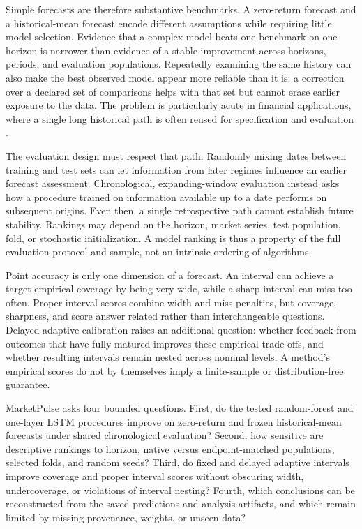\documentclass[11pt]{article}
\begin{document}
Simple forecasts are therefore substantive benchmarks. A zero-return forecast and a historical-mean forecast encode different assumptions while requiring little model selection. Evidence that a complex model beats one benchmark on one horizon is narrower than evidence of a stable improvement across horizons, periods, and evaluation populations. Repeatedly examining the same history can also make the best observed model appear more reliable than it is; a correction over a declared set of comparisons helps with that set but cannot erase earlier exposure to the data. The problem is particularly acute in financial applications, where a single long historical path is often reused for specification and evaluation \citep{white2000}.

The evaluation design must respect that path. Randomly mixing dates between training and test sets can let information from later regimes influence an earlier forecast assessment. Chronological, expanding-window evaluation instead asks how a procedure trained on information available up to a date performs on subsequent origins. Even then, a single retrospective path cannot establish future stability. Rankings may depend on the horizon, market series, test population, fold, or stochastic initialization. A model ranking is thus a property of the full evaluation protocol and sample, not an intrinsic ordering of algorithms.

Point accuracy is only one dimension of a forecast. An interval can achieve a target empirical coverage by being very wide, while a sharp interval can miss too often. Proper interval scores combine width and miss penalties, but coverage, sharpness, and score answer related rather than interchangeable questions. Delayed adaptive calibration raises an additional question: whether feedback from outcomes that have fully matured improves these empirical trade-offs, and whether resulting intervals remain nested across nominal levels. A method's empirical scores do not by themselves imply a finite-sample or distribution-free guarantee.

MarketPulse asks four bounded questions. First, do the tested random-forest and one-layer LSTM procedures improve on zero-return and frozen historical-mean forecasts under shared chronological evaluation? Second, how sensitive are descriptive rankings to horizon, native versus endpoint-matched populations, selected folds, and random seeds? Third, do fixed and delayed adaptive intervals improve coverage and proper interval scores without obscuring width, undercoverage, or violations of interval nesting? Fourth, which conclusions can be reconstructed from the saved predictions and analysis artifacts, and which remain limited by missing provenance, weights, or unseen data?
\end{document}
